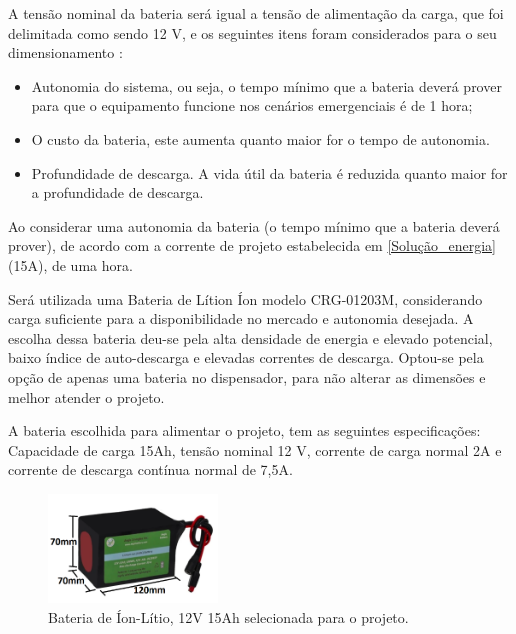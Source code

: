 
A tensão nominal da bateria será igual a tensão de alimentação da carga, que foi delimitada como sendo 12 V, e os seguintes itens foram considerados para o seu dimensionamento \cite{bateria}:

\begin{itemize}
    \item Autonomia do sistema, ou seja, o tempo mínimo que a bateria deverá prover para que o equipamento funcione nos cenários emergenciais é de 1 hora;
    \item O custo da bateria, este aumenta quanto maior for o tempo de autonomia.
    \item Profundidade de descarga. A vida útil da bateria é reduzida quanto maior for a profundidade de descarga.
\end{itemize}

Ao considerar uma autonomia da bateria (o tempo mínimo que a bateria deverá prover), de acordo com a corrente de projeto estabelecida em \ref{Solução_energia} (15A), de uma hora. 

Será utilizada uma Bateria de Lítion Íon modelo CRG-01203M, considerando carga suficiente para a disponibilidade no mercado e autonomia desejada. A escolha dessa bateria deu-se pela alta densidade de energia e elevado potencial, baixo índice de auto-descarga e elevadas correntes de descarga. Optou-se pela opção de apenas uma bateria no dispensador, para não alterar as dimensões e melhor atender o projeto. 

A bateria escolhida para alimentar o projeto, tem as seguintes especificações: Capacidade de carga 15Ah, tensão nominal 12 V, corrente de carga normal 2A e corrente de descarga contínua normal de 7,5A.

\begin{figure}[H]
\centering
    \includegraphics[width=0.4\textwidth]{figuras/bateria.PNG}
    \caption{Bateria de Íon-Lítio, 12V 15Ah selecionada para o projeto.}
\end{figure}

